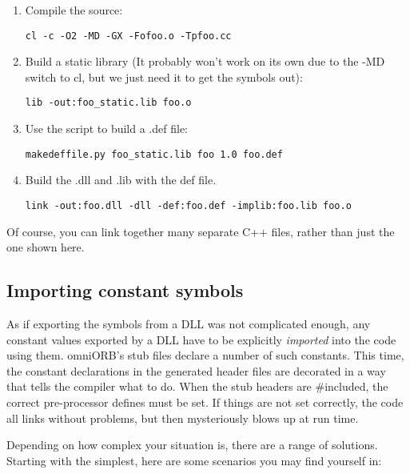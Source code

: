 \documentclass[11pt,twoside,a4paper]{book}
\newcommand{\cmdline}[1]{\texttt{#1}}
\begin{document}
\begin{enumerate}
\item Compile the source:

  \cmdline{cl -c -O2 -MD -GX -Fofoo.o -Tpfoo.cc}

\item Build a static library (It probably won't work on its own due to
      the -MD switch to cl, but we just need it to get the symbols
      out):

  \cmdline{lib -out:foo\_static.lib foo.o}

\item Use the script to build a .def file:

  \cmdline{makedeffile.py foo\_static.lib foo 1.0 foo.def}

\item Build the .dll and .lib with the def file.

  \cmdline{link -out:foo.dll -dll -def:foo.def -implib:foo.lib foo.o}
\end{enumerate}

Of course, you can link together many separate C++ files, rather than
just the one shown here.


\subsection{Importing constant symbols}

As if exporting the symbols from a DLL was not complicated enough, any
constant values exported by a DLL have to be explicitly
\emph{imported} into the code using them. omniORB's stub files declare
a number of such constants. This time, the constant declarations in
the generated header files are decorated in a way that tells the
compiler what to do. When the stub headers are \#included, the correct
pre-processor defines must be set. If things are not set correctly,
the code all links without problems, but then mysteriously blows up at
run time.

Depending on how complex your situation is, there are a range of
solutions. Starting with the simplest, here are some scenarios you may
find yourself in:
\end{document}
